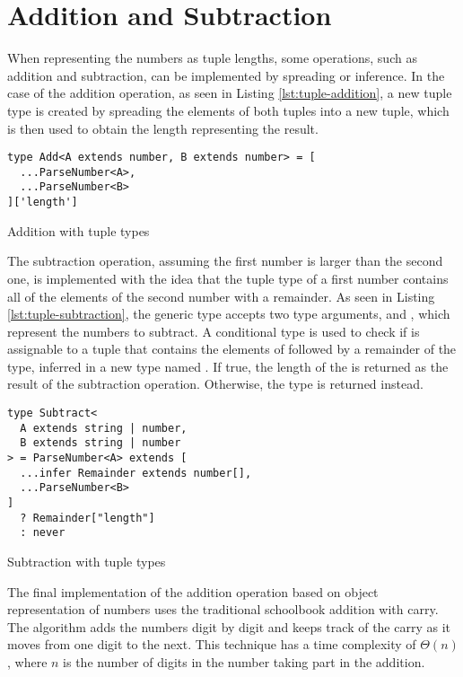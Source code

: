 \section{Addition and Subtraction}

When representing the numbers as tuple lengths, some operations, such as addition and subtraction, can be implemented by spreading or inference. In the case of the addition operation, as seen in Listing \ref{lst:tuple-addition}, a new tuple type is created by spreading the elements of both tuples into a new tuple, which is then used to obtain the length representing the result.

\begin{listing}[ht]
  \begin{verbatim}
type Add<A extends number, B extends number> = [
  ...ParseNumber<A>, 
  ...ParseNumber<B>
]['length']
\end{verbatim}
  \caption{Addition with tuple types}\label{lst:tuple-addition}
\end{listing}

The subtraction operation, assuming the first number is larger than the second one, is implemented with the idea that the tuple type of a first number contains all of the elements of the second number with a remainder. As seen in Listing \ref{lst:tuple-subtraction}, the  generic type accepts two type arguments,  and , which represent the numbers to subtract. A conditional type is used to check if  is assignable to a tuple that contains the elements of  followed by a remainder of the  type, inferred in a new type named . If true, the length of the  is returned as the result of the subtraction operation. Otherwise, the  type is returned instead.

\begin{listing}[ht]
  \begin{verbatim}
type Subtract<
  A extends string | number,
  B extends string | number
> = ParseNumber<A> extends [
  ...infer Remainder extends number[],
  ...ParseNumber<B>
]
  ? Remainder["length"]
  : never
\end{verbatim}
  \caption{Subtraction with tuple types}\label{lst:tuple-subtraction}
\end{listing}

The final implementation of the addition operation based on object representation of numbers uses the traditional schoolbook addition with carry. The algorithm adds the numbers digit by digit and keeps track of the carry as it moves from one digit to the next. This technique has a time complexity of $\Theta(n)$, where $n$ is the number of digits in the number taking part in the addition.

